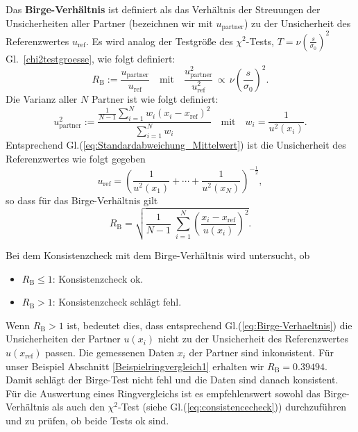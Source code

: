 Das \textbf{Birge-Verhältnis} ist definiert als das Verhältnis der Streuungen der Unsicherheiten aller Partner 
(bezeichnen wir mit $u_\mathrm{partner}$) zu der Unsicherheit des Referenzwertes $u_\mathrm{ref}$. Es wird
analog der Testgröße des $\chi^2$-Tests, $T = \nu \left(\frac{s}{\sigma_0}\right)^2$ Gl.~\ref{chi2testgroesse}, wie
folgt definiert:
\begin{equation}
R_\mathrm{B} := \frac{u_\mathrm{partner}}{u_\mathrm{ref}}
\quad \text{mit} \quad 
\frac{u^2_\mathrm{partner}}{u^2_\mathrm{ref}} \, \propto \, 
\nu \left(\frac{s}{\sigma_0}\right)^2.
\end{equation}
Die Varianz aller $N$ Partner ist wie folgt definiert:
\begin{equation}
u^2_\mathrm{partner} := \frac{\frac{1}{N-1} \sum\limits_{i=1}^{N} w_i \left(x_i-x_\mathrm{ref} \right)^2}
{\sum\limits_{i=1}^{N} w_i} \quad \text{mit} \quad w_i = \frac{1}{u^2(x_i)} .
\end{equation}
Entsprechend Gl.(\ref{eq:Standardabweichung_Mittelwert}) ist die Unsicherheit des Referenzwertes wie folgt gegeben
\begin{equation}
u_\mathrm{ref} = \left(\frac{1}{u^2(x_1)} +  \cdots + \frac{1}{u^2(x_N)} \right)^{-\frac{1}{2}},
\end{equation}
so dass für das Birge-Verhältnis gilt
\begin{equation}
R_\mathrm{B} = \sqrt{\frac{1}{N-1} \; \sum_{i=1}^N \left( \frac{x_i-x_\mathrm{ref}}{u(x_i)} \right)^2 }.
		\label{eq:Birge-Verhaeltnis}
\end{equation}

Bei dem Konsistenzcheck mit dem Birge-Verhältnis wird untersucht, ob  
\begin{itemize}
	\item $R_\mathrm{B} \le 1$: Konsistenzcheck ok. 
	\item $R_\mathrm{B} > 1$: Konsistenzcheck schlägt fehl.
\end{itemize}
Wenn $R_\mathrm{B} > 1$ ist, bedeutet dies, dass entsprechend Gl.(\ref{eq:Birge-Verhaeltnis}) die Unsicherheiten der Partner 
$u(x_i)$ nicht zu der Unsicherheit des Referenzwertes $u(x_\mathrm{ref})$ passen.
Die gemessenen Daten $x_i$ der Partner sind inkonsistent.
Für unser Beispiel Abschnitt \ref{Beispielringvergleich1} erhalten wir $R_\mathrm{B} = 0.39494$.
Damit schlägt der Birge-Test nicht fehl und die Daten sind 
danach konsistent. Für die Auswertung eines Ringvergleichs ist es empfehlenswert sowohl das Birge-Verhältnis als auch den $\chi^2$-Test
(siehe Gl.(\ref{eq:consistencecheck})) durchzuführen und zu prüfen, ob beide Tests ok sind. 

